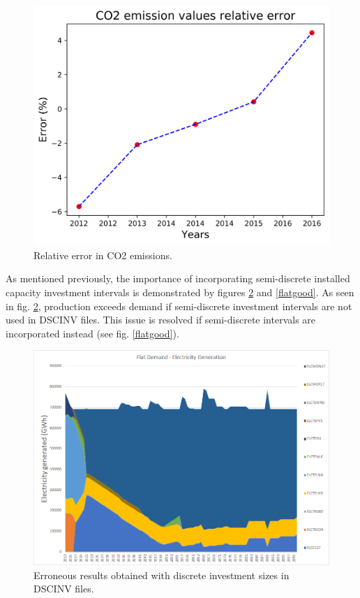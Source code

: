 \documentclass[14pt,a4paper]{article} %
\begin{document}
\begin{figure}[H] \label{co2err}
\centering
\includegraphics[scale=0.6]{co2-err}
\caption{Relative error in CO2 emissions.}
\label{co2err}
\end{figure}

As mentioned previously, the importance of incorporating semi-discrete installed capacity investment intervals is demonstrated by figures \ref{flatbug} and \ref{flatgood}. As seen in fig. \ref{flatbug}, production exceeds demand if semi-discrete investment intervals are not used in \gls{DSCINV} files. This issue is resolved if semi-discrete intervals are incorporated instead (see fig. \ref{flatgood}).

\begin{figure}[H]
\centering
\includegraphics[scale=0.45]{flat-bug}
\caption{Erroneous results obtained with discrete investment sizes in \gls{DSCINV} files.}
\label{flatbug}
\end{figure}
\end{document}
